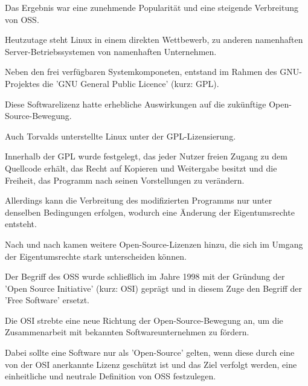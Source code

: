 Das Ergebnis war eine zunehmende Popularität und eine steigende Verbreitung von OSS.

Heutzutage steht Linux in einem direkten Wettbewerb, zu anderen namenhaften Server-Betriebssystemen von namenhaften Unternehmen. 

Neben den frei verfügbaren Systemkomponeten, entstand im Rahmen des GNU-Projektes die 'GNU General Public Licence' (kurz: GPL). 

Diese Softwarelizenz hatte erhebliche Auswirkungen auf die zukünftige Open-Source-Bewegung.

Auch Torvalds unterstellte Linux unter der GPL-Lizensierung. 

Innerhalb der GPL wurde festgelegt, das jeder Nutzer freien Zugang zu dem Quellcode erhält, das Recht auf Kopieren und Weitergabe besitzt und die Freiheit, das Programm nach seinen Vorstellungen zu verändern. 

Allerdings kann die Verbreitung des modifizierten Programms nur unter denselben Bedingungen erfolgen, wodurch eine Änderung der Eigentumsrechte entsteht. 

Nach und nach kamen weitere Open-Source-Lizenzen hinzu, die sich im Umgang der Eigentumsrechte stark unterscheiden können. 

Der Begriff des OSS wurde schließlich im Jahre 1998 mit der Gründung der 'Open Source Initiative' (kurz: OSI) geprägt und in diesem Zuge den Begriff der 'Free Software' ersetzt. 

Die OSI strebte eine neue Richtung der Open-Source-Bewegung an, um die Zusammenarbeit mit bekannten Softwareunternehmen zu fördern. 

Dabei sollte eine Software nur als 'Open-Source' gelten, wenn diese durch eine von der OSI anerkannte Lizenz geschützt ist und das Ziel verfolgt werden, eine einheitliche und neutrale Definition von OSS festzulegen.






